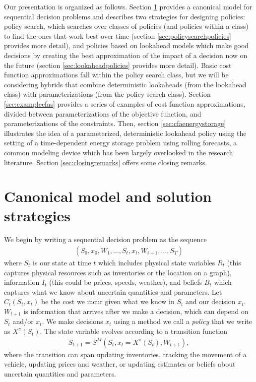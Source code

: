 \documentclass[11pt,oneside,fleqn,reqno,titlepage]{article}
\newcommand{\bns}{\begin{eqnarray*}}
\newcommand{\ens}{\end{eqnarray*}}
\newcounter{example}
\begin{document}
Our presentation is organized as follows.  Section \ref{sec:canonicalmodel} provides a canonical model for sequential decision problems and describes two strategies for designing policies: policy search, which searches over classes of policies (and policies within a class) to find the ones that work best over time (section \ref{sec:policysearchpolicies} provides more detail), and policies based on lookahead models which make good decisions by creating the best approximation of the impact of a decision now on the future (section \ref{sec:lookaheadpolicies} provides more detail).  Basic cost function approximations fall within the policy search class, but we will be considering hybrids that combine deterministic lookaheads (from the lookahead class) with parameterizations (from the policy search class).  Section \ref{sec:examplecfas} provides a series of examples of cost function approximations, divided between parameterizations of the objective function, and parameterizations of the constraints.  Then, section \ref{sec:cfaenergystorage} illustrates the idea of a parameterized, deterministic lookahead policy using the setting of a time-dependent energy storage problem using rolling forecasts, a common modeling device which has been largely overlooked in the research literature.  Section \ref{sec:closingremarks} offers some closing remarks.


\section{Canonical model and solution strategies}
\label{sec:canonicalmodel}
We begin by writing a sequential decision problem as the sequence
\bns
(S_0,x_0,W_1, \ldots, S_t, x_t, W_{t+1}, \ldots, S_T)
\ens
where $S_t$ is our state at time $t$ which includes physical state variables $R_t$ (this captures physical resources such as inventories or the location on a graph), information $I_t$ (this could be prices, speeds, weather), and beliefs $B_t$ which captures what we know about uncertain quantities and parameters.  Let $C_t(S_t,x_t)$ be the cost we incur given what we know in $S_t$ and our decision $x_t$.  $W_{t+1}$ is information that arrives after we make a decision, which can depend on $S_t$ and/or $x_t$.  We make decisions $x_t$ using a method we call a {\it policy} that we write as $X^\pi(S_t)$.  The state variable evolves according to a transition function
\bns
S_{t+1} = S^M(S_t,x_t = X^\pi(S_t), W_{t+1}),
\ens
where the transition can span updating inventories, tracking the movement of a vehicle, updating prices and weather, or updating estimates or beliefs about uncertain quantities and parameters.
\end{document}
